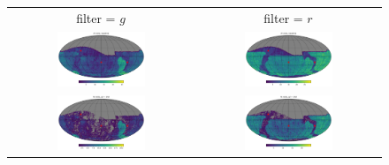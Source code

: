 \documentclass[preprintm,linenumbers]{aastex631}
\begin{document}
\begin{figure}
   		\centering
			\begin{tabular}{c c}
          filter = $g$ &  filter = $r$\\
   		\includegraphics[width=0.5\textwidth]{results/skymaps_cutout/skymaps_cutout_first_year_one_snap_v4_0_10yrs_db_noDD_noTwi_nside-256_CountMetric_g_noDD_noTwi.pdf} &
   		\includegraphics[width=0.5\textwidth]{results/skymaps_cutout/skymaps_cutout_first_year_one_snap_v4_0_10yrs_db_noDD_noTwi_nside-256_CountMetric_r_noDD_noTwi.pdf} \\

         \includegraphics[width=0.5\textwidth]{results/skymaps_cutout/skymaps_cutout_first_year_one_snap_v4_0_10yrs_db_noDD_noTwi_tscale-14_nside-256_doAllTemplateMetrics_reduceCount_g_noDD_noTwi.pdf} &
         \includegraphics[width=0.5\textwidth]{results/skymaps_cutout/skymaps_cutout_first_year_one_snap_v4_0_10yrs_db_noDD_noTwi_tscale-14_nside-256_doAllTemplateMetrics_reduceCount_r_noDD_noTwi.pdf} \\


\end{tabular}
\end{figure}
\end{document}
